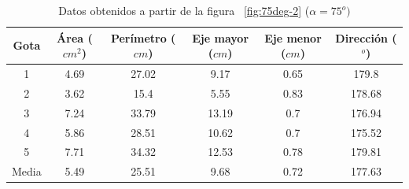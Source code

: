 \begin{table}[H] \centering \caption{Datos obtenidos a partir de la figura
    ~\ref{fig:75deg-2} ($\alpha=75^o)$} \label{tab:75deg-2}
    \begin{tabular}{cccccc} \toprule Gota & Área ($cm^2$) & Perímetro ($cm$) &
        Eje mayor ($cm$) & Eje menor ($cm$) & Dirección ($^o$) \\ \midrule 1 &
        4.69 & 27.02 & 9.17  & 0.65 & 179.8  \\ 2 & 3.62 & 15.4  & 5.55  & 0.83
             & 178.68 \\ 3 & 7.24 & 33.79 & 13.19 & 0.7  & 176.94 \\ 4 & 5.86 &
        28.51 & 10.62 & 0.7  & 175.52 \\ 5 & 7.71 & 34.32 & 12.53 & 0.78 &
    179.81 \\ \midrule Media \footnotemark & 5.49 & 25.51 & 9.68 & 0.72 &
177.63 \\ \bottomrule \end{tabular} \end{table} 
